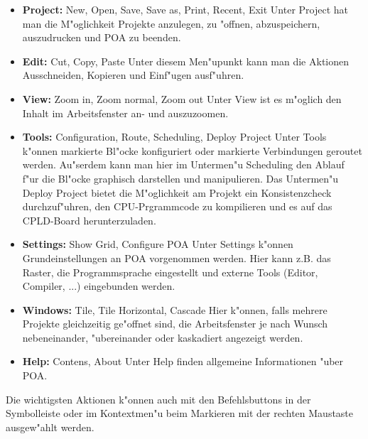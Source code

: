 \documentclass[a4paper,titlepage,12pt,ngerman]{scrbook}
\begin{document}
\begin{itemize}
\item {\bf Project:}	New, Open, Save, Save as, Print, Recent, Exit\newline
Unter Project hat man die M"oglichkeit Projekte anzulegen, zu "offnen, abzuspeichern, auszudrucken und POA zu beenden.
\item {\bf Edit:}	Cut, Copy, Paste\newline
Unter diesem Men"upunkt kann man die Aktionen Ausschneiden, Kopieren und Einf"ugen ausf"uhren.
\item {\bf View:}	Zoom in, Zoom normal, Zoom out\newline
Unter View ist es m"oglich den Inhalt im Arbeitsfenster an- und auszuzoomen.
\item {\bf Tools:} 	Configuration, Route, Scheduling, Deploy Project\newline
Unter Tools k"onnen markierte Bl"ocke konfiguriert oder markierte Verbindungen geroutet werden. Au"serdem kann man hier im Untermen"u Scheduling den Ablauf f"ur die Bl"ocke graphisch darstellen und manipulieren. Das Untermen"u Deploy Project bietet die M"oglichkeit am Projekt ein Konsistenzcheck durchzuf"uhren, den CPU-Prgrammcode zu kompilieren und es auf das CPLD-Board herunterzuladen.
\item {\bf Settings:}	Show Grid, Configure POA\newline
Unter Settings k"onnen Grundeinstellungen an POA vorgenommen werden. Hier kann z.B. das Raster, die Programmsprache eingestellt und externe Tools (Editor, Compiler, ...) eingebunden werden.
\item {\bf Windows:} 	Tile, Tile Horizontal, Cascade\newline
Hier k"onnen, falls mehrere Projekte gleichzeitig ge"offnet sind, die Arbeitsfenster je nach Wunsch nebeneinander, "ubereinander oder kaskadiert angezeigt werden.
\item {\bf Help:} 	Contens, About\newline
Unter Help finden allgemeine Informationen "uber POA.\par
\end{itemize}

Die wichtigsten Aktionen k"onnen auch mit den Befehlsbuttons in der Symbolleiste oder im Kontextmen"u beim Markieren mit der rechten Maustaste ausgew"ahlt werden.
\end{document}
